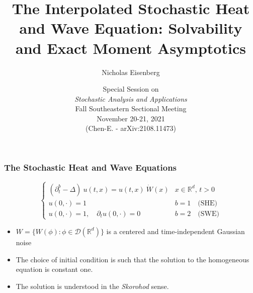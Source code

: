 \documentclass{beamer}%
\title[About Beamer] %
{The Interpolated Stochastic Heat and Wave Equation: Solvability and Exact Moment Asymptotics}
\author[Arthur, Doe] %
{Nicholas Eisenberg}
\institute[Auburn University]
{
	\pgfuseimage{AU}\\[1em]
	\vspace{.1em}
}
\date[VLC 2021] %
{ \small Special Session on \\
	{\it Stochastic Analysis and Applications}\\[1em]
	Fall Southeastern Sectional Meeting\\[0.5em]
	November 20-21, 2021\\[1em]
	(Chen-E. - arXiv:2108.11473)}
\numberwithin{equation}{section}
\newcommand{\R}{\mathbb{R}}
\begin{document}
	
	
	\frame{\titlepage}
	
	\setcounter{page}{1}
	\begin{frame}[t]%
		\frametitle{The Stochastic Heat and Wave Equations}
		
		\begin{equation*}
		\begin{cases}
		\left(\partial^b_t  -\Delta \right)\: u(t,x) =  u(t,x)\: \dot W(x) & \text{$x\in \R^d$, $t>0$} \\
		u(0,\cdot) = 1                                                     & b=1 \quad \text{(SHE)}    \\
		u(0,\cdot) = 1, \quad \partial_t u(0,\cdot) = 0                    & b=2 \quad \text{(SWE)}
		\end{cases}
		\end{equation*}
		
		\vfill
		\begin{itemize}
			\item $W = \{ W(\phi) : \phi \in \mathcal{D}(\R^d) \}$ is a centered and time-independent Gaussian noise
			\bigskip
			\item The choice of initial condition is such that the solution to the homogeneous equation is constant one.
			\bigskip
			\item The solution is understood in the {\it Skorohod} sense.
		\end{itemize}
		
	\end{frame}%
\end{document}
